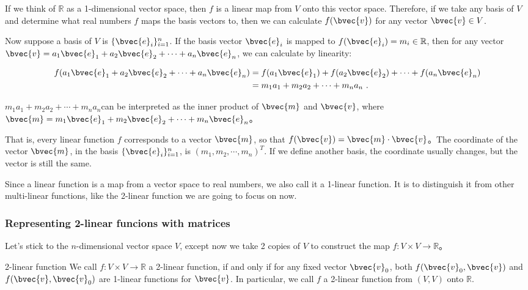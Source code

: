 If we think of $\mathbb{R}$ as a 1-dimensional vector space, then $f$ is a linear map from $V$ onto this vector space. Therefore, if we take any basis of $V$ and determine what real numbers $f$ maps the basis vectors to, then we can calculate $f(\bvec{v})$ for any vector $\bvec{v}\in V$. 

Now suppose a basis of $V$ is $\{\bvec{e}_i\}^n_{i=1}$. If the basis vector $\bvec{e}_i$ is mapped to $f(\bvec{e}_i)=m_i\in\mathbb{R}$, then for any vector $\bvec{v}=a_1\bvec{e}_1+a_2\bvec{e}_2+\cdots+a_n\bvec{e}_n$, we can calculate by linearity: 

\begin{equation}
\begin{aligned}
f(a_1\bvec{e}_1+a_2\bvec{e}_2+\cdots+a_n\bvec{e}_n)&=f(a_1\bvec{e}_1)+f(a_2\bvec{e}_2)+\cdots+f(a_n\bvec{e}_n)\\&=m_1a_1+m_2a_2+\cdots+m_na_n~.
\end{aligned}
\end{equation}


$m_1a_1+m_2a_2+\cdots+m_na_n$can be interpreted as the inner product of $\bvec{m}$ and $\bvec{v}$, where$\bvec{m}=m_1\bvec{e}_1+m_2\bvec{e}_2+\cdots+m_n\bvec{e}_n$。

That is, every linear function $f$ corresponds to a vector $\bvec{m}$, so that $f(\bvec{v})=\bvec{m}\cdot\bvec{v}$。The coordinate of the vector $\bvec{m}$, in the basis $\{\bvec{e}_i\}_{i=1}^n$, is $(m_1, m_2, \cdots, m_n)^T$. If we define another basis, the coordinate usually changes, but the vector is still the same. 

Since a linear function is a map from a vector space to real numbers, we also call it a 1-linear function. It is to distinguish it from other multi-linear functions, like the 2-linear function we are going to focus on now. 

\subsubsection{Representing 2-linear funcions with matrices}

Let's stick to the $n$-dimensional vector space $V$, except now we take 2 copies of $V$ to construct the map $f:V\times V\rightarrow\mathbb{R}$。

\begin{definition}{2-linear function}
We call $f:V\times V\rightarrow\mathbb{R}$ a 2-linear function, if and only if for any fixed vector $\bvec{v}_0$, both $f(\bvec{v}_0, \bvec{v})$ and $f(\bvec{v}, \bvec{v}_0)$ are 1-linear functions for $\bvec{v}$. In particular, we call $f$ a 2-linear function from $(V, V)$ onto $\mathbb{R}$. 
\end{definition}

